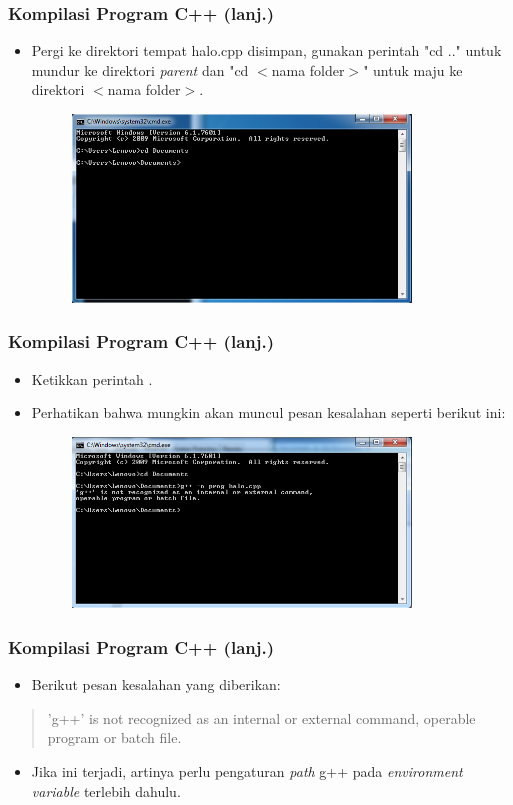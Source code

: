 \begin{frame}
\frametitle{Kompilasi Program C++ (lanj.)}
\begin{itemize}
  \item Pergi ke direktori tempat halo.cpp disimpan, gunakan perintah "cd .." untuk mundur ke direktori \textit{parent} dan "cd $<$nama folder$>$" untuk maju ke direktori $<$nama folder$>$.
  \begin{figure}
    \includegraphics[width=9cm]{asset/cmd-1.png}
  \end{figure}
\end{itemize}
\end{frame}

\begin{frame}
\frametitle{Kompilasi Program C++ (lanj.)}
\begin{itemize}
  \item Ketikkan perintah \compilehelo.
  \item Perhatikan bahwa mungkin akan muncul pesan kesalahan seperti berikut ini:
  \begin{figure}
    \includegraphics[width=9cm]{asset/cpp-compile-1.png}
  \end{figure}
\end{itemize}
\end{frame}

\begin{frame}[fragile]
\frametitle{Kompilasi Program C++ (lanj.)}
\begin{itemize}
  \item Berikut pesan kesalahan yang diberikan:
\end{itemize}
\begin{quote}
'g++' is not recognized as an internal or external command, operable program or batch file.
\end{quote}
\begin{itemize}
  \item Jika ini terjadi, artinya perlu pengaturan \textit{path} g++ pada \textit{environment variable} terlebih dahulu.
\end{itemize}
\end{frame}

